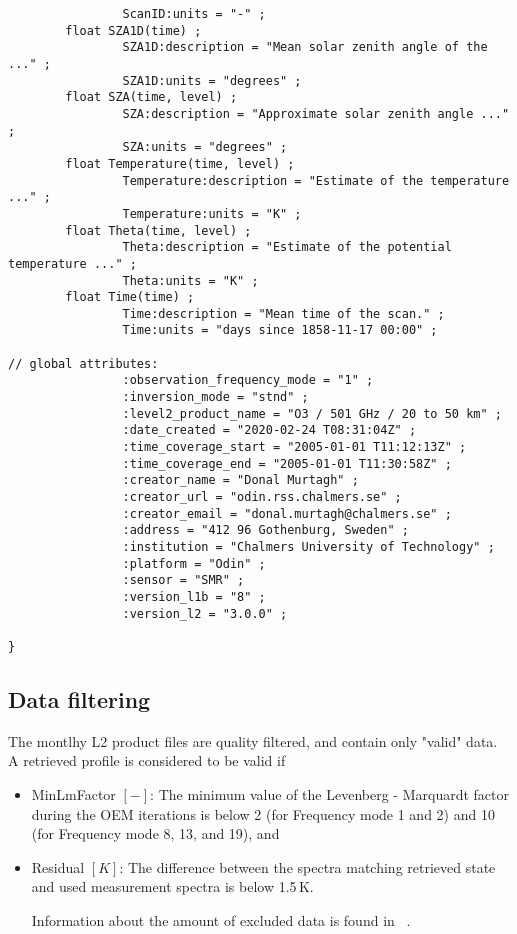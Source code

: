 \begin{verbatim}
                ScanID:units = "-" ;
        float SZA1D(time) ;
                SZA1D:description = "Mean solar zenith angle of the ..." ;
                SZA1D:units = "degrees" ;
        float SZA(time, level) ;
                SZA:description = "Approximate solar zenith angle ..." ;
                SZA:units = "degrees" ;
        float Temperature(time, level) ;
                Temperature:description = "Estimate of the temperature ..." ;
                Temperature:units = "K" ;
        float Theta(time, level) ;
                Theta:description = "Estimate of the potential temperature ..." ;
                Theta:units = "K" ;
        float Time(time) ;
                Time:description = "Mean time of the scan." ;
                Time:units = "days since 1858-11-17 00:00" ;

// global attributes:
                :observation_frequency_mode = "1" ;
                :inversion_mode = "stnd" ;
                :level2_product_name = "O3 / 501 GHz / 20 to 50 km" ;
                :date_created = "2020-02-24 T08:31:04Z" ;
                :time_coverage_start = "2005-01-01 T11:12:13Z" ;
                :time_coverage_end = "2005-01-01 T11:30:58Z" ;
                :creator_name = "Donal Murtagh" ;
                :creator_url = "odin.rss.chalmers.se" ;
                :creator_email = "donal.murtagh@chalmers.se" ;
                :address = "412 96 Gothenburg, Sweden" ;
                :institution = "Chalmers University of Technology" ;
                :platform = "Odin" ;
                :sensor = "SMR" ;
                :version_l1b = "8" ;
                :version_l2 = "3.0.0" ;

}
\end{verbatim}


\subsection{Data filtering}
\label{sec:data_filtering}

The montlhy L2 product files are quality filtered, and contain only "valid" data. A retrieved profile
is considered to be valid if 
\begin{itemize}

  \item MinLmFactor \([-]\): The minimum value of the Levenberg - Marquardt factor during the OEM iterations
  is below 2 (for Frequency mode 1 and 2) and 10 (for Frequency mode 8, 13, and 19), and

  \item Residual \([K]\):  The difference between the spectra matching retrieved state and
   used measurement spectra is below 1.5\,K.

Information about the amount of excluded data is found in ~\cite{cadl2data}.
\end{itemize}



